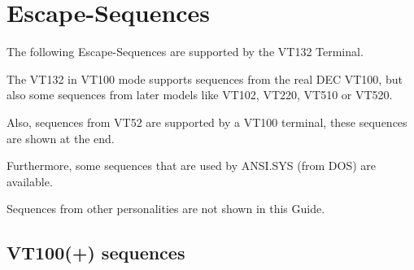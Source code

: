 \chapter{Escape-Sequences}

The following Escape-Sequences are supported by the VT132 Terminal.

The VT132 in VT100 mode supports sequences from the real DEC VT100, but also some sequences from later models like
VT102, VT220, VT510 or VT520.

Also, sequences from VT52 are supported by a VT100 terminal, these sequences are shown at the end.

Furthermore, some sequences that are used by ANSI.SYS (from DOS) are available.

Sequences from other personalities are not shown in this Guide.

\newpage
\section{VT100(+) sequences}

